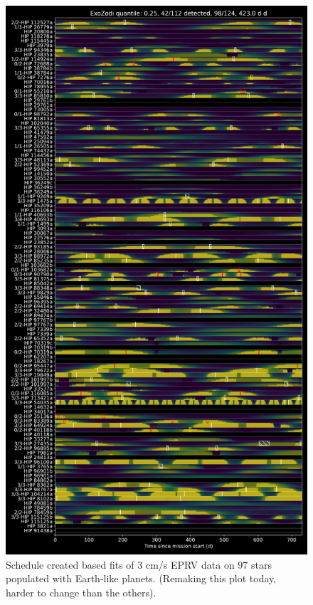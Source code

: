 \begin{figure}
  \begin{center}
    \includegraphics[height=0.9\textheight]{ch4/figures/example_schedule.png}
  \end{center}
  \caption{
    Schedule created based fits of 3 cm/s EPRV data on 97 stars populated with
    Earth-like planets. (Remaking this plot today, harder to change than the others).
  }
  \label{fig:schedule}
\end{figure}

